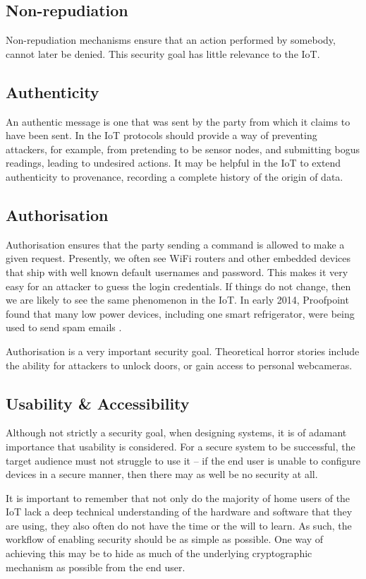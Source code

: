 \documentclass[10pt,journal,compsoc]{IEEEtran}
\begin{document}
\subsection{Non-repudiation}
Non-repudiation mechanisms ensure that an action performed by somebody, cannot
later be denied. This security goal has little relevance to the IoT. 

\subsection{Authenticity}
An authentic message is one that was sent by the party from which it claims to
have been sent. In the IoT protocols should provide a way of preventing
attackers, for example, from pretending to be sensor nodes, and submitting
bogus readings, leading to undesired actions. It may be helpful in the IoT to
extend authenticity to provenance, recording a complete history of the origin
of data.  

\subsection{Authorisation}
Authorisation ensures that the party sending a command is allowed
to make a given request. Presently, we often see WiFi routers
and other embedded devices that ship with well known default usernames
and password. This makes it very easy for an attacker to guess the login
credentials. If things do not change, then we are likely to see the same
phenomenon in the IoT. In early 2014, Proofpoint found that many low power
devices, including one smart refrigerator, were being used to send spam emails
\cite{Proofpoint2014}.

Authorisation is a very important security goal. Theoretical horror stories
include the ability for attackers to unlock doors, or gain access to personal
webcameras.  

\subsection{Usability \& Accessibility}
Although not strictly a security goal, when designing systems, it is of
adamant importance that usability is considered. For a secure system to be
successful, the target audience must not struggle to use it -- if the end
user is unable to configure devices in a secure manner, then there may as well
be no security at all.

It is important to remember that not only do the majority of home users of the
IoT lack a deep technical understanding of the hardware and software that they
are using, they also often do not have the time or the will to learn.  As such,
the workflow of enabling security should be as simple as possible. One way of
achieving this may be to hide as much of the underlying cryptographic mechanism
as possible from the end user.
\end{document}
